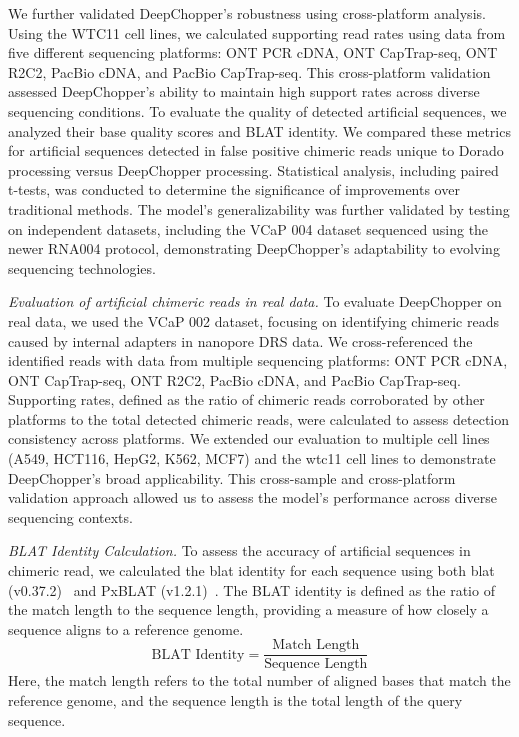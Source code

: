 \documentclass[pdflatex, sn-mathphys-num, lineno]{sn-jnl}%
\theoremstyle{thmstyleone}%
\theoremstyle{thmstyletwo}%
\theoremstyle{thmstylethree}%
\begin{document}
We further validated DeepChopper's robustness using cross-platform analysis.
Using the WTC11 cell lines, we calculated supporting read rates using data from five different sequencing platforms: ONT PCR cDNA, ONT CapTrap-seq, ONT R2C2, PacBio cDNA, and PacBio CapTrap-seq.
This cross-platform validation assessed DeepChopper's ability to maintain high support rates across diverse sequencing conditions.
To evaluate the quality of detected artificial sequences, we analyzed their base quality scores and BLAT identity.
We compared these metrics for artificial sequences detected in false positive chimeric reads unique to Dorado processing versus DeepChopper processing.
Statistical analysis, including paired t-tests, was conducted to determine the significance of improvements over traditional methods.
The model's generalizability was further validated by testing on independent datasets, including the VCaP 004 dataset sequenced using the newer RNA004 protocol, demonstrating DeepChopper's adaptability to evolving sequencing technologies.

\textit{Evaluation of artificial chimeric reads in real data.} To evaluate DeepChopper on real data, we used the VCaP 002 dataset, focusing on identifying chimeric reads caused by internal adapters in nanopore DRS data.
We cross-referenced the identified reads with data from multiple sequencing platforms: ONT PCR cDNA, ONT CapTrap-seq, ONT R2C2, PacBio cDNA, and PacBio CapTrap-seq.
Supporting rates, defined as the ratio of chimeric reads corroborated by other platforms to the total detected chimeric reads, were calculated to assess detection consistency across platforms.
We extended our evaluation to multiple cell lines (A549, HCT116, HepG2, K562, MCF7) and the wtc11 cell lines to demonstrate DeepChopper's broad applicability.
This cross-sample and cross-platform validation approach allowed us to assess the model's performance across diverse sequencing contexts.


\textit{BLAT Identity Calculation.} To assess the accuracy of artificial sequences in chimeric read, we calculated the \gls{blat} identity for each sequence using both \gls{blat} (v0.37.2)~\cite{kent2002blat} and PxBLAT (v1.2.1)~\cite{li2024pxblat}.
The BLAT identity is defined as the ratio of the match length to the sequence length, providing a measure of how closely a sequence aligns to a reference genome.
\[
\textrm{BLAT Identity} = \frac{\textrm{Match Length}}{\textrm{Sequence Length}}
\]
Here, the match length refers to the total number of aligned bases that match the reference genome, and the sequence length is the total length of the query sequence.
\end{document}
